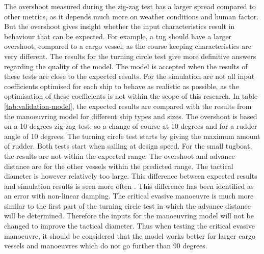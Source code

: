 The overshoot measured during the zig-zag test has a larger spread compared to other metrics, as it depends much more on weather conditions and human factor. But the overshoot gives insight whether the input characteristics result in behaviour that can be expected. For example, a tug should have a larger overshoot, compared to a cargo vessel, as the course keeping characteristics are very different. The results for the turning circle test give more definitive answers regarding the quality of the model. The model is accepted when the results of these tests are close to the expected results. For the simulation are not all input coefficients optimised for each ship to behave as realistic as possible, as the optimisation of these coefficients is not within the scope of this research. In table \ref{tab:validation-model}, the expected results are compared with the results from the manoeuvring model for different ship types and sizes. The overshoot is based on a 10 degrees zig-zag test, so a change of course at 10 degrees and for a rudder angle of 10 degrees. The turning circle test starts by giving the maximum amount of rudder. Both tests start when sailing at design speed. For the small tugboat, the results are not within the expected range. The overshoot and advance distance are for the other vessels within the predicted range. The tactical diameter is however relatively too large. This difference between expected results and simulation results is seen more often \cite{Tjoswold2012}. This difference has been identified as an error with non-linear damping. The critical evasive manoeuvre is much more similar to the first part of the turning circle test in which the advance distance will be determined. Therefore the inputs for the manoeuvring model will not be changed to improve the tactical diameter. 
Thus when testing the critical evasive manoeuvre, it should be considered that the model works better for larger cargo vessels and manoeuvres which do not go further than 90 degrees.

